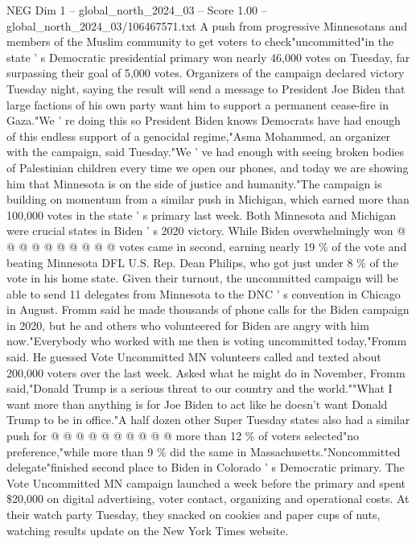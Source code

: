 \begin{textsample}{NEG Dim 1 – global\_north\_2024\_03 – Score 1.00 – global\_north\_2024\_03/106467571.txt}  \label{ex:f1_neg_393}
A push from progressive Minnesotans and members of the Muslim community to get voters to check"uncommitted"in the state ' s Democratic presidential primary won nearly 46,000 votes on Tuesday, far surpassing their goal of 5,000 votes.
Organizers of the campaign declared victory Tuesday night, saying the result will send a message to President Joe Biden that large factions of his own party want him to support a permanent cease-fire in Gaza."We ' re doing this so President Biden knows Democrats have had enough of this endless support of a genocidal regime,"Asma Mohammed, an organizer with the campaign, said Tuesday."We ' ve had enough with seeing broken bodies of Palestinian children every time we open our phones, and today we are showing him that Minnesota is on the side of justice and humanity."The campaign is building on momentum from a similar push in Michigan, which earned more than 100,000 votes in the state ' s primary last week.
Both Minnesota and Michigan were crucial states in Biden ' s 2020 victory.
While Biden overwhelmingly won @ @ @ @ @ @ @ @ @ @ votes came in second, earning nearly 19 \% of the vote and beating Minnesota DFL U.S.
Rep.
Dean Philips, who got just under 8 \% of the vote in his home state.
Given their turnout, the uncommitted campaign will be able to send 11 delegates from Minnesota to the DNC ' s convention in Chicago in August.
Fromm said he made thousands of phone calls for the Biden campaign in 2020, but he and others who volunteered for Biden are angry with him now."Everybody who worked with me then is voting uncommitted today,"Fromm said.
He guessed Vote Uncommitted MN volunteers called and texted about 200,000 voters over the last week.
Asked what he might do in November, Fromm said,"Donald Trump is a serious threat to our country and the world.""What I want more than anything is for Joe Biden to act like he doesn't want Donald Trump to be in office."A half dozen other Super Tuesday states also had a similar push for @ @ @ @ @ @ @ @ @ @ more than 12 \% of voters selected"no preference,"while more than 9 \% did the same in Massachusetts."Noncommitted delegate"finished second place to Biden in Colorado ' s Democratic primary.
The Vote Uncommitted MN campaign launched a week before the primary and spent \$20,000 on digital advertising, voter contact, organizing and operational costs.
At their watch party Tuesday, they snacked on cookies and paper cups of nuts, watching results update on the New York Times website.

\end{textsample}

